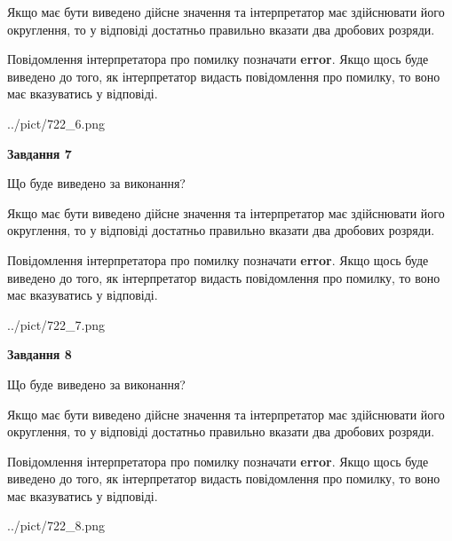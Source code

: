 \documentclass[12pt, ukrainian]{article}
\begin{document}
{\begin {Large}
Якщо має бути виведено дійсне значення та інтерпретатор має здійснювати його округлення, 
то у відповіді достатньо правильно вказати два дробових розряди.

Повідомлення інтерпретатора про помилку позначати \textbf{error}.
Якщо щось буде виведено до того, як інтерпретатор видасть повідомлення про помилку, 
то воно має вказуватись у відповіді. \par

\begin{center}
	{../pict/722_6.png}
\end{center}
\newpage

{\begin {center}\textbf{Завдання 7}\end {center}}\par
Що буде виведено за виконання? \par

Якщо має бути виведено дійсне значення та інтерпретатор має здійснювати його округлення, 
то у відповіді достатньо правильно вказати два дробових розряди.

Повідомлення інтерпретатора про помилку позначати \textbf{error}.
Якщо щось буде виведено до того, як інтерпретатор видасть повідомлення про помилку, 
то воно має вказуватись у відповіді. \par

\begin{center}
	{../pict/722_7.png}
\end{center}
\newpage

{\begin {center}\textbf{Завдання 8}\end {center}}\par
Що буде виведено за виконання? \par

Якщо має бути виведено дійсне значення та інтерпретатор має здійснювати його округлення, 
то у відповіді достатньо правильно вказати два дробових розряди.

Повідомлення інтерпретатора про помилку позначати \textbf{error}.
Якщо щось буде виведено до того, як інтерпретатор видасть повідомлення про помилку, 
то воно має вказуватись у відповіді. \par

\begin{center}
	{../pict/722_8.png}
\end{center}
\newpage


\end{Large}}
\end{document}
